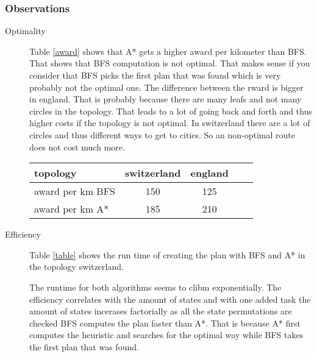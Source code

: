\documentclass[11pt]{article}
\begin{document}
\subsubsection{Observations}
\begin{description}
	\item[Optimality] Table  \ref{award} shows that A* gets a higher award per kilometer than BFS. That shows that BFS computation is not optimal. That makes sense if you consider that BFS picks the first plan that was found which is very probably not the optimal one.
The difference between the rward is bigger in england. That is probably because there are many leafs and not many circles in the topology. That leads to a lot of going back and forth and thus higher costs if the topology is not optimal. In switzerland there are a lot of circles and thus different ways to get to cities. So an non-optimal route does not cost much more.	


\begin{table*}

\centering

\begin{tabular}{l*{3}{c}r}

topology          & switzerland & england  \\

\hline

award per km BFS &150 	&125\\

award per km A*   &185&210\\


\end{tabular}

\caption{Award per kilometer for BFS and A*}

\label{award} 
\end{table*}







\item[Efficiency]  Table \ref{table} shows the run time of creating the plan with BFS and A* in the topology switzerland. 

The runtime for both algorithms seems to clibm exponentially. The efficiency correlates with the amount of states and with one added task the amount of states incerases factorially as all the state permutations are checked
BFS computes the plan faster than A*. That is because A* first computes the heuristic and searches for the optimal way while BFS takes the first plan that was found. 


\end{description}
\end{document}
